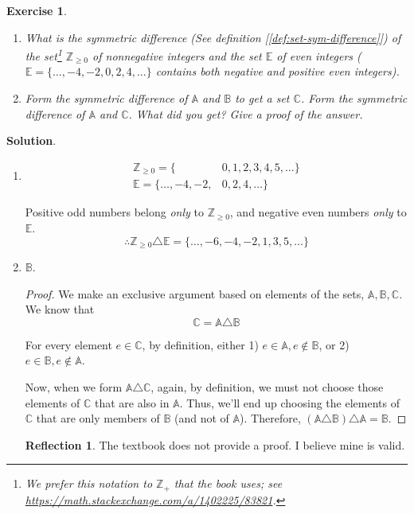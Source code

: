 \documentclass[11pt]{book}
\theoremstyle{definition}
\theoremstyle{plain}
\newtheorem{exercise}{Exercise}
\theoremstyle{definition}
\theoremstyle{problemstyle}
\theoremstyle{remark}
\theoremstyle{definition}
\newtheorem{reflection}{Reflection}
\begin{document}
\begin{exercise}

    \begin{enumerate}[label={(\alph*)}]
        \item What is the symmetric difference (See definition [\ref{def:set-sym-difference}]) of the set\footnote{We prefer this notation to $\mathbb{Z}_{+}$ that the book uses; see \url{https://math.stackexchange.com/a/1402225/83821}.} $\mathbb{Z}_{\geq0}$ of nonnegative integers and the set $\mathbb{E}$ of even integers ($\mathbb{E}=\{\dots,-4,-2,0,2,4,\dots\}$ contains both negative and positive even integers).

        \item Form the symmetric difference of $\mathbb{A}$ and $\mathbb{B}$ to get a set $\mathbb{C}$. Form the symmetric difference of $\mathbb{A}$ and $\mathbb{C}$. What did you get? Give a proof of the answer.
    \end{enumerate}
    \label{ex:1.2.18}
\end{exercise}
\textbf{Solution}.
    \begin{enumerate}[label={(\alph*)}]
        \item 
            \begin{align*}
                \mathbb{Z}_{\geq0}=\{&0,1,2,3,4,5,\dots\}\\
                \mathbb{E}=\{\dots,-4,-2,&0,2,4,\dots\}
            \end{align*}

            Positive odd numbers belong \emph{only} to $\mathbb{Z}_{\geq0}$, and negative even numbers \emph{only} to $\mathbb{E}$.
            \[
                \therefore \mathbb{Z}_{\geq0}\triangle\mathbb{E}=\{\dots,-6,-4,-2,1,3,5,\dots\}
            \]

        \item $\mathbb{B}$.
            \begin{proof}
                We make an exclusive argument based on elements of the sets, $\mathbb{A,B,C}$. We know that 
                \[
                    \mathbb{C}=\mathbb{A}\triangle\mathbb{B}
                \]

                For every element $e\in\mathbb{C}$, by definition, either 1) $e\in\mathbb{A},e\not\in\mathbb{B}$, or 2) $e\in\mathbb{B},e\not\in\mathbb{A}$.

                Now, when we form $\mathbb{A}\triangle\mathbb{C}$, again, by definition, we must not choose those elements of $\mathbb{C}$ that are also in $\mathbb{A}$. Thus, we'll end up choosing the elements of $\mathbb{C}$ that are only members of $\mathbb{B}$ (and not of $\mathbb{A}$). Therefore, $(\mathbb{A}\triangle\mathbb{B})\triangle\mathbb{A}=\mathbb{B}$.
            \end{proof}
            \begin{reflection}
                The textbook does not provide a proof. I believe mine is valid.
            \end{reflection}
    \end{enumerate}
\end{document}
